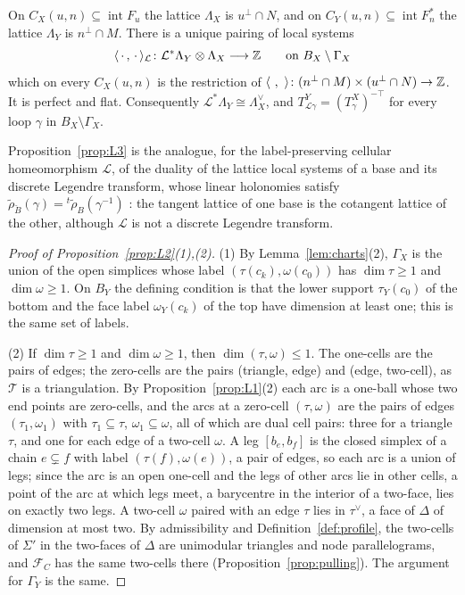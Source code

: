 \begin{proposition}\label{prop:L3}
On $C_X(u,n)\subseteq\operatorname{int}F_u$ the lattice $\Lambda_X$ is $u^\perp\cap N$, and on $C_Y(u,n)\subseteq
\operatorname{int}F^*_n$ the lattice $\Lambda_Y$ is $n^\perp\cap M$. There is a unique pairing of local systems
\[
\langle\,\cdot\,,\,\cdot\,\rangle_{\mathcal L}\colon\mathcal L^*\Lambda_Y\otimes\Lambda_X\longrightarrow\mathbb Z\qquad\text{on }B_X\setminus\Gamma_X
\]
which on every $C_X(u,n)$ is the restriction of $\langle\ ,\ \rangle\colon(n^\perp\cap M)\times(u^\perp\cap N)\to\Z$. It is
perfect and flat. Consequently $\mathcal L^*\Lambda_Y\cong\Lambda_X^\vee$, and $T^Y_{\mathcal L\gamma}=(T^X_\gamma)^{-\top}$
for every loop $\gamma$ in $B_X\setminus\Gamma_X$.
\end{proposition}
Proposition~\ref{prop:L3} is the analogue, for the label-preserving cellular homeomorphism $\mathcal L$, of the duality of the lattice local
systems of a base and its discrete Legendre transform, whose linear holonomies satisfy
$\tilde\rho_{\check B}(\gamma)={}^t\tilde\rho_B(\gamma^{-1})$ \cite[Prop.~1.50(1)]{GSI}: the tangent lattice of one base is the
cotangent lattice of the other, although $\mathcal L$ is not a discrete Legendre transform.

\begin{proof}[Proof of Proposition~\ref{prop:L2}(1),(2)]
(1) By Lemma~\ref{lem:charts}(2), $\Gamma_X$ is the union of the open simplices whose label $(\tau(c_k),\omega(c_0))$ has
$\dim\tau\ge1$ and $\dim\omega\ge1$. On $B_Y$ the defining condition is that the lower support $\tau_Y(c_0)$ of the bottom
and the face label $\omega_Y(c_k)$ of the top have dimension at least one; this is the same set of labels.

(2) If $\dim\tau\ge1$ and $\dim\omega\ge1$, then $\dim(\tau,\omega)\le1$. The one-cells are the pairs of edges; the
zero-cells are the pairs (triangle, edge) and (edge, two-cell), as $\mathcal T$ is a triangulation. By
Proposition~\ref{prop:L1}(2) each arc is a one-ball whose two end points are zero-cells, and the arcs at a zero-cell
$(\tau,\omega)$ are the pairs of edges $(\tau_1,\omega_1)$ with $\tau_1\subseteq\tau$, $\omega_1\subseteq\omega$, all of
which are dual cell pairs: three for a triangle $\tau$, and one for each edge of a two-cell $\omega$. A leg $[b_e,b_f]$ is the
closed simplex of a chain $e\subsetneq f$ with label $(\tau(f),\omega(e))$, a pair of edges, so each arc is a union of
legs; since the arc is an open one-cell and the legs of other arcs lie in other cells, a point of the arc at which legs
meet, a barycentre in the interior of a two-face, lies on exactly two legs. A two-cell $\omega$ paired with an edge $\tau$ lies in $\tau^\vee$, a face of $\Delta$ of
dimension at most two. By admissibility and Definition~\ref{def:profile}, the two-cells of $\Sigma'$ in the two-faces of
$\Delta$ are unimodular triangles and node parallelograms, and $\mathcal F_C$ has the same two-cells there
(Proposition~\ref{prop:pulling}). The argument for $\Gamma_Y$ is the same.
\end{proof}

